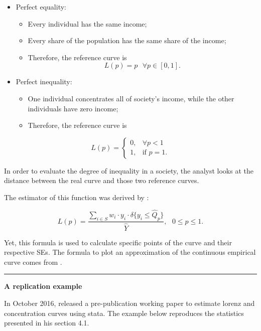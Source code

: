 \documentclass[
]{book}
\providecommand{\tightlist}{%
  \setlength{\itemsep}{0pt}\setlength{\parskip}{0pt}}
\begin{document}
\begin{itemize}
\tightlist
\item
  Perfect equality:

  \begin{itemize}
  \tightlist
  \item
    Every individual has the same income;
  \item
    Every share of the population has the same share of the income;
  \item
    Therefore, the reference curve is \[L(p) = p \text{ } \forall p \in [0,1] \text{.}\]
  \end{itemize}
\item
  Perfect inequality:

  \begin{itemize}
  \tightlist
  \item
    One individual concentrates all of society's income, while the other individuals have zero income;
  \item
    Therefore, the reference curve is
  \end{itemize}
\end{itemize}

\[
L(p)=
\begin{cases}
0, &\forall p < 1 \\
1, &\text{if } p = 1 \text{.}
\end{cases}
\]

In order to evaluate the degree of inequality in a society, the analyst looks at the distance between the real curve and those two reference curves.

The estimator of this function was derived by \textcite{kovacevic1997}:

\[
L(p) = \frac{ \sum_{i \in S} w_i \cdot y_i \cdot \delta \{ y_i \le \widehat{Q}_p \}}{\widehat{Y}}, \text{ } 0 \le p \le 1.
\]

Yet, this formula is used to calculate specific points of the curve and their respective SEs. The formula to plot an approximation of the continuous empirical curve comes from \textcite{lerman1989}.

\begin{center}\rule{0.5\linewidth}{0.5pt}\end{center}

\textbf{A replication example}

In October 2016, \autocite{jann2016} released a pre-publication working paper to estimate lorenz and concentration curves using stata. The example below reproduces the statistics presented in his section 4.1.
\end{document}

